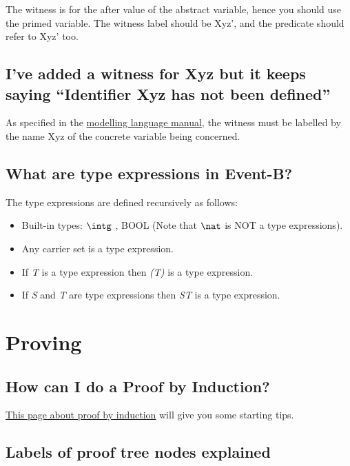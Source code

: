 The witness is for the after value of the abstract variable, hence you should use the primed variable. The witness label should be \textsf{Xyz'}, and the predicate should refer to \textsf{Xyz'} too. 

\subsection{I've added a witness for \textsf{Xyz} but it keeps saying ``Identifier \textsf{Xyz} has not been defined''}

As specified in the \href{http://wiki.event-b.org/index.php/Witnesses_(Modelling_Language)}{modelling language manual}, the witness must be labelled by the name \textsf{Xyz} of the concrete variable being concerned.

\subsection{What are type expressions in Event-B?}

The type expressions are defined recursively as follows: 

\begin{itemize}
	\item Built-in types: $\intg$ , BOOL (Note that $\nat$ is NOT a type expressions). 
	\item Any carrier set is a type expression. 
	\item If \textit{T} is a type expression then \textit{(T)} is a type expression. 
	\item If \textit{S} and \textit{T} are type expressions then \textit{ST} is a type expression. 
\end{itemize} 

\section{Proving}

\subsection{How can I do a Proof by Induction?}

\href{http://wiki.event-b.org/index.php/Induction_proof}{This page about proof by induction} will give you some starting tips.

\subsection{Labels of proof tree nodes explained}

